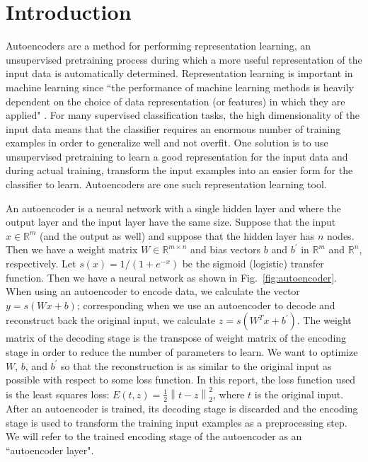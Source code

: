 \documentclass[conference]{IEEEtran}
\newcommand{\norm}[1]{\left\lVert #1 \right\rVert}
\begin{document}
\section{Introduction}
Autoencoders are a method for performing representation learning, an unsupervised pretraining process during which a more useful representation of the
input data is automatically determined. Representation learning is important in machine learning since ``the performance of 
machine learning methods is heavily dependent on the choice of data representation (or features) in which they are applied" 
\cite{bengio2012rep}. For many supervised classification tasks, the high dimensionality of the input data means that the classifier requires an enormous number of training examples in order to generalize well and not overfit. One solution is to use unsupervised pretraining to learn a good representation for the input data and during actual training, transform the input examples into an easier form for the classifier to learn. Autoencoders are one such representation learning tool.

An autoencoder is a neural network with a single hidden layer and where the output layer and the input layer have the same size. Suppose that the input $x\in\mathbb{R}^m$ (and the output as well) and suppose that the hidden layer has $n$ nodes. Then we have a weight matrix $W\in\mathbb{R}^{m\times n}$ and bias vectors $b$ and $b^{'}$ in $\mathbb{R}^m$ and $\mathbb{R}^n$, respectively. Let $s(x) = 1/(1+e^{-x})$ be the sigmoid (logistic) transfer function. Then we have a neural network as shown in Fig.~\ref{fig:autoencoder}. When using an autoencoder to encode data, we calculate the vector $y=s(Wx + b)$; corresponding when we use an autoencoder to decode and reconstruct back the original input, we calculate $z=s(W^{T}x+b^{'})$. The weight matrix of the decoding stage is the transpose of weight matrix of the encoding stage in order to reduce the number of parameters to learn. We want to optimize $W$, $b$, and $b^{'}$ so that the reconstruction is as similar to the original input as possible with respect to some loss function. In this report, the loss function used is the least squares loss: $E(t,z)=\frac{1}{2}\norm{t-z}_2^2$, where $t$ is the original input. After an autoencoder is trained, its decoding stage is discarded and the encoding stage is used to transform the training input examples as a preprocessing step. We will refer to the trained encoding stage of the autoencoder as an ``autoencoder layer".  
\end{document}

